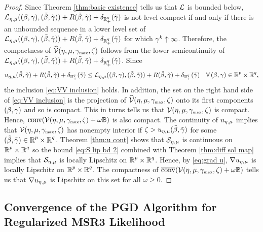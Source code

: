 \begin{proof}
Since Theorem \ref{thm:basic existence} tells us that
$\LL$ is bounded below, 
$\LL_{\emu}(\bg,\tbg) + R\tbg+\del_{\R^q_+}(\tgam)$ is not level compact
if and only if there is an unbounded sequence
in a lower level set of 
$\LL_{\emu}(\bg,\tbg) + R\tbg+\del_{\R^q_+}(\tgam)$ 
for which $\gam^k\uparrow\infty$.
Therefore, the compactness of $\widehat\VV(\eta,\mu,\gammax,\zeta)$ 
follows from the lower semicontinuity of  
$\LL_{\emu}(\bg,\tbg) + R\tbg+\del_{\R^q_+}(\tgam)$.
Since
\[
\uemu\tbg + R\tbg+\del_{\Rqp}(\tgam)\le 
\LL_{\emu}(\bg,\tbg) + R\tbg+\del_{\R^q_+}(\tgam)\quad
\forall\, \bg\in\Rp\times\Rq,
\]
the inclusion \eqref{eq:VV inclusion} holds.
In addition, the set on the right hand side of \eqref{eq:VV inclusion}
is the projection of $\widehat\VV(\eta,\mu,\gammax,\zeta)$ onto
its
first components $\bg$ and so is compact. This in turns tells us that 
$\VV(\eta,\mu,\gammax,\zeta)$ is compact. Hence, 
$\clco(\VV(\eta,\mu,\gammax,\zeta)+\omega\uball)$
is also compact. The continuity of $\uemu$ implies that 
$\VV(\eta,\mu,\gammax,\zeta)$ has nonempty interior if
$\zeta>\uemu\tbg$ for some $\tbg\in\Rp\times\Rq$.
Theorem \ref{thm:u cont} shows that $\SS_\emu$ is continuous on 
$\Rp\times\Rq$ so the bound \eqref{eq:S lip bd 2} combined with 
Theorem \ref{thm:diff sol map} implies that $\SS_\emu$ is locally
Lipschitz on $\Rp\times\Rq$. Hence, by \eqref{eq:grad u},
$\nabla \uemu$ is locally Lipschitz on $\Rp\times\Rq$.
The compactness of 
$\clco(\VV(\eta,\mu,\gammax,\zeta)+\omega\uball)$
tells us that $\nabla \uemu$ is Lipschitz on
this set for all $\omega\ge 0$.
\end{proof}


\subsection{Convergence of the PGD Algorithm for Regularized MSR3 Likelihood}
\label{sec:convergence pgd}

